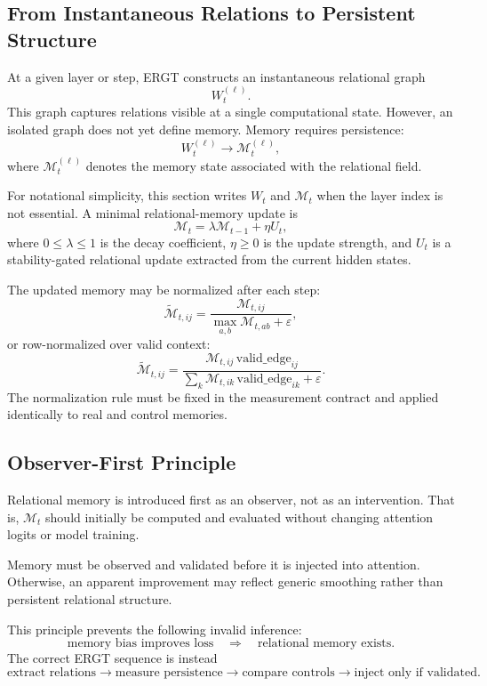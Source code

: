 \documentclass[11pt]{article}
\begin{document}
\subsection{From Instantaneous Relations to Persistent Structure}

At a given layer or step, ERGT constructs an instantaneous relational graph
\[
W_t^{(\ell)}.
\]
This graph captures relations visible at a single computational state. However, an isolated graph does not yet define memory. Memory requires persistence:
\[
W_t^{(\ell)}
\longrightarrow
\mathcal{M}_t^{(\ell)},
\]
where $\mathcal{M}_t^{(\ell)}$ denotes the memory state associated with the relational field.

For notational simplicity, this section writes $W_t$ and $\mathcal{M}_t$ when the layer index is not essential. A minimal relational-memory update is
\[
\mathcal{M}_t
=
\lambda\mathcal{M}_{t-1}
+
\eta U_t,
\]
where $0\leq\lambda\leq 1$ is the decay coefficient, $\eta\geq0$ is the update strength, and $U_t$ is a stability-gated relational update extracted from the current hidden states.

The updated memory may be normalized after each step:
\[
\widetilde{\mathcal{M}}_{t,ij}
=
\frac{\mathcal{M}_{t,ij}}{\max_{a,b}\mathcal{M}_{t,ab}+\varepsilon},
\]
or row-normalized over valid context:
\[
\widetilde{\mathcal{M}}_{t,ij}
=
\frac{\mathcal{M}_{t,ij}\,\mathrm{valid\_edge}_{ij}}
{\sum_{k}\mathcal{M}_{t,ik}\,\mathrm{valid\_edge}_{ik}+\varepsilon}.
\]
The normalization rule must be fixed in the measurement contract and applied identically to real and control memories.

\subsection{Observer-First Principle}

Relational memory is introduced first as an observer, not as an intervention. That is, $\mathcal{M}_t$ should initially be computed and evaluated without changing attention logits or model training.

\begin{ergtclaim}
Memory must be observed and validated before it is injected into attention. Otherwise, an apparent improvement may reflect generic smoothing rather than persistent relational structure.
\end{ergtclaim}

This principle prevents the following invalid inference:
\[
\text{memory bias improves loss}
\quad\Rightarrow\quad
\text{relational memory exists}.
\]
The correct ERGT sequence is instead
\[
\text{extract relations}
\rightarrow
\text{measure persistence}
\rightarrow
\text{compare controls}
\rightarrow
\text{inject only if validated}.
\]
\end{document}
